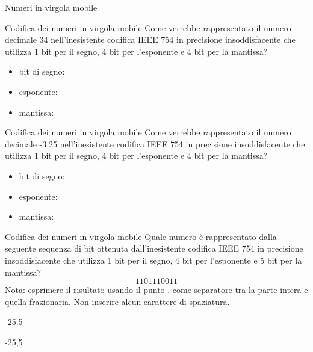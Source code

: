 \documentclass[11pt]{article}
\begin{document}
\begin{quiz}{Numeri in virgola mobile}
\begin{cloze}[points=1,shuffle=false]{Codifica dei numeri in virgola mobile}
Come verrebbe rappresentato il numero decimale 34 nell'inesistente codifica IEEE 754 in precisione
insoddisfacente che utilizza 1 bit per il segno, 4 bit per l'esponente e 4 bit per la mantissa?
\begin{itemize}
\item bit di segno: 
\item esponente:  
\item mantissa: 
\end{itemize}
\end{cloze}

\begin{cloze}[points=1,shuffle=false]{Codifica dei numeri in virgola mobile}
Come verrebbe rappresentato il numero decimale -3.25 nell'inesistente codifica IEEE 754 in precisione
insoddisfacente che utilizza 1 bit per il segno, 4 bit per l'esponente e 4 bit per la mantissa?
\begin{itemize}
\item bit di segno: 
\item esponente:  
\item mantissa: 
\end{itemize}
\end{cloze}





\begin{shortanswer}[points=1]{Codifica dei numeri in virgola mobile}
Quale numero \`{e} rappresentato dalla seguente sequenza di bit ottenuta dall'inesistente codifica IEEE 754 in precisione
insoddisfacente che utilizza 1 bit per il segno, 4 bit per l'esponente e 5 bit per la mantissa?
 $$ 1101110011 $$
Nota: esprimere il risultato usando il punto . come separatore tra la parte intera e quella frazionaria. Non inserire alcun carattere di spaziatura.
\item[] -25.5
\item[] -25,5
\end{shortanswer}


\end{quiz}
\end{document}
